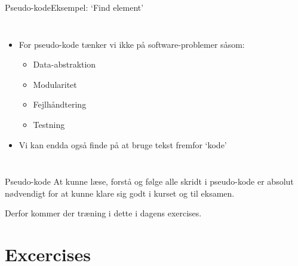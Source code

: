 \documentclass[aspectratio=1610]{beamer}
\begin{document}
\begin{frame}{Pseudo-kode}{Eksempel: `Find element'}

    \begin{columns}
        \begin{itemize}
            \item For pseudo-kode tænker vi ikke på software-problemer såsom:
                \begin{itemize}
                    \item Data-abstraktion
                    \item Modularitet
                    \item Fejlhåndtering
                    \item Testning
                \end{itemize}
            \item Vi kan endda også finde på at bruge tekst fremfor `kode'
        \end{itemize}



    \end{columns}

\end{frame}

\begin{frame}{Pseudo-kode}
    At kunne læse, forstå og følge alle skridt i pseudo-kode er \alert{absolut
    nødvendigt} for at kunne klare sig godt i kurset og til eksamen.

    \pause
    \medskip

    Derfor kommer der træning i dette i dagens exercises.
\end{frame}

\section{Excercises}%
\end{document}
